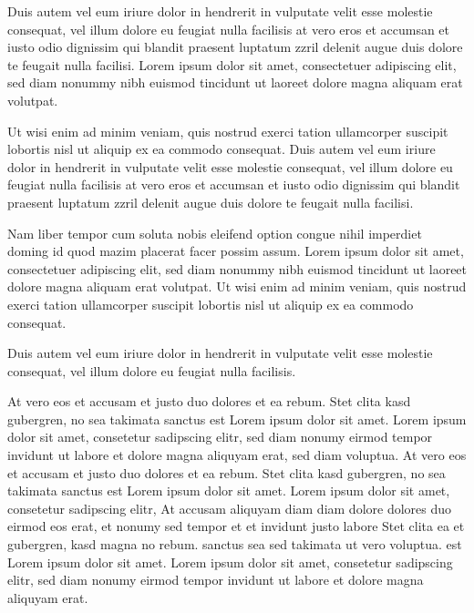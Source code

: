 Duis autem vel eum iriure dolor in hendrerit in vulputate velit esse molestie consequat, vel illum dolore eu feugiat
nulla facilisis at vero eros et accumsan et iusto odio dignissim qui blandit praesent luptatum zzril delenit augue
duis dolore te feugait nulla facilisi. Lorem ipsum dolor sit amet, consectetuer adipiscing elit, sed diam nonummy
nibh euismod tincidunt ut laoreet dolore magna aliquam erat volutpat.

Ut wisi enim ad minim veniam, quis nostrud exerci tation ullamcorper suscipit lobortis nisl ut aliquip ex ea commodo
consequat. Duis autem vel eum iriure dolor in hendrerit in vulputate velit esse molestie consequat, vel illum dolore
eu feugiat nulla facilisis at vero eros et accumsan et iusto odio dignissim qui blandit praesent luptatum zzril
delenit augue duis dolore te feugait nulla facilisi.

Nam liber tempor cum soluta nobis eleifend option congue nihil imperdiet doming id quod mazim placerat facer possim
assum. Lorem ipsum dolor sit amet, consectetuer adipiscing elit, sed diam nonummy nibh euismod tincidunt ut laoreet
dolore magna aliquam erat volutpat. Ut wisi enim ad minim veniam, quis nostrud exerci tation ullamcorper suscipit
lobortis nisl ut aliquip ex ea commodo consequat.

Duis autem vel eum iriure dolor in hendrerit in vulputate velit esse molestie consequat, vel illum dolore eu feugiat
nulla facilisis.

At vero eos et accusam et justo duo dolores et ea rebum. Stet clita kasd gubergren, no sea takimata sanctus est Lorem
ipsum dolor sit amet. Lorem ipsum dolor sit amet, consetetur sadipscing elitr, sed diam nonumy eirmod tempor invidunt
ut labore et dolore magna aliquyam erat, sed diam voluptua. At vero eos et accusam et justo duo dolores et ea rebum.
Stet clita kasd gubergren, no sea takimata sanctus est Lorem ipsum dolor sit amet. Lorem ipsum dolor sit amet,
consetetur sadipscing elitr, At accusam aliquyam diam diam dolore dolores duo eirmod eos erat, et nonumy sed tempor
et et invidunt justo labore Stet clita ea et gubergren, kasd magna no rebum. sanctus sea sed takimata ut vero
voluptua. est Lorem ipsum dolor sit amet. Lorem ipsum dolor sit amet, consetetur sadipscing elitr, sed diam nonumy
eirmod tempor invidunt ut labore et dolore magna aliquyam erat.

